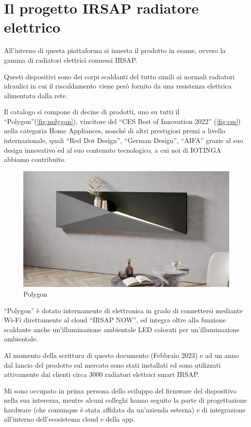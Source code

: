\documentclass[12pt,a4paper,twoside,titlepage]{book}
\begin{document}
\section{Il progetto IRSAP radiatore elettrico}

All'interno di questa piattaforma si innesta il prodotto in esame,
ovvero la gamma di radiatori elettrici connessi IRSAP.

Questi dispositivi sono dei corpi scaldanti del tutto simili ai normali radiatori
idraulici in cui il riscaldamento viene però fornito da una resistenza elettrica
alimentata dalla rete.

Il catalogo si compone di
decine di prodotti, uno su tutti il ``Polygon''(\autoref{fig:polygon}), vincitore del
``CES Best of Innovation 2022'' (\autoref{fig:ces}) nella categoria Home Appliances,
nonché di altri prestigiosi premi a livello internazionale, quali ``Red Dot Design'',
``German Design'', ``AIFA'' %
grazie al suo design innovativo ed al suo contenuto tecnologico,
a cui noi di IOTINGA abbiamo contribuito.

\begin{figure}[ht]
    \centering
    \includegraphics[width=12cm]{img/polygon.jpeg}
    \caption{Polygon}
    \label{fig:polygon}
\end{figure}

``Polygon'' è dotato internamente di elettronica in grado di connettersi mediante
Wi-Fi direttamente al cloud ``IRSAP NOW'', ed integra oltre alla funzione scaldante
anche un'illuminazione ambientale LED colorati per un'illuminazione ambientale.

Al momento della scrittura di questo documento (Febbraio 2023) e ad un anno dal lancio
del prodotto sul mercato sono stati installati ed sono utilizzati attivamente dai clienti
circa 3000 radiatori elettrici smart IRSAP.

Mi sono occupato in prima persona dello sviluppo del firmware del dispositivo nella
sua interezza, mentre alcuni colleghi hanno seguito la parte di progettazione hardware
(che comunque è stata affidata da un'azienda esterna) e di integrazione all'interno
dell'ecosistema cloud e della app.
\end{document}
